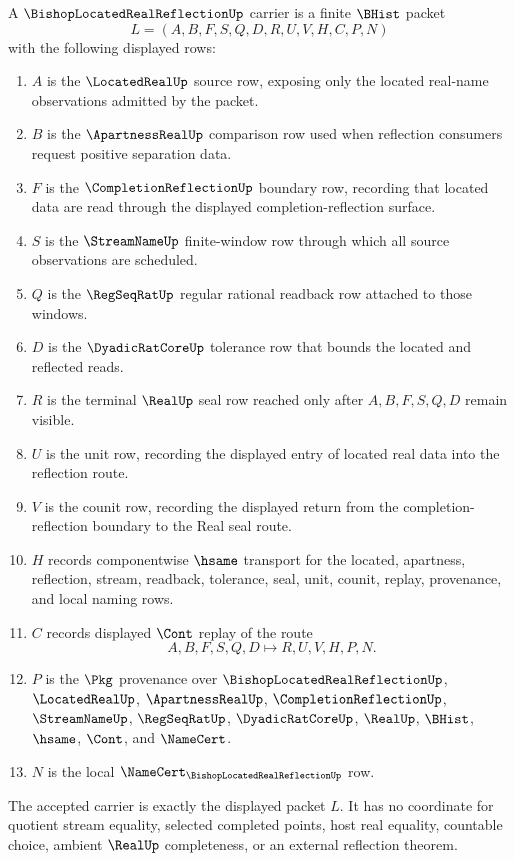 \begin{definition}
\label{def:bishop-located-real-reflection-carrier}
A $\BishopLocatedRealReflectionUp$ carrier is a finite $\BHist$ packet
$$
L=(A,B,F,S,Q,D,R,U,V,H,C,P,N)
$$
with the following displayed rows:
\begin{enumerate}
\item $A$ is the $\LocatedRealUp$ source row, exposing only the located real-name observations admitted by the packet.
\item $B$ is the $\ApartnessRealUp$ comparison row used when reflection consumers request positive separation data.
\item $F$ is the $\CompletionReflectionUp$ boundary row, recording that located data are read through the displayed completion-reflection surface.
\item $S$ is the $\StreamNameUp$ finite-window row through which all source observations are scheduled.
\item $Q$ is the $\RegSeqRatUp$ regular rational readback row attached to those windows.
\item $D$ is the $\DyadicRatCoreUp$ tolerance row that bounds the located and reflected reads.
\item $R$ is the terminal $\RealUp$ seal row reached only after $A,B,F,S,Q,D$ remain visible.
\item $U$ is the unit row, recording the displayed entry of located real data into the reflection route.
\item $V$ is the counit row, recording the displayed return from the completion-reflection boundary to the Real seal route.
\item $H$ records componentwise $\hsame$ transport for the located, apartness, reflection, stream, readback, tolerance, seal, unit, counit, replay, provenance, and local naming rows.
\item $C$ records displayed $\Cont$ replay of the route
$$
A,B,F,S,Q,D \longmapsto R,U,V,H,P,N .
$$
\item $P$ is the $\Pkg$ provenance over $\BishopLocatedRealReflectionUp$, $\LocatedRealUp$, $\ApartnessRealUp$, $\CompletionReflectionUp$, $\StreamNameUp$, $\RegSeqRatUp$, $\DyadicRatCoreUp$, $\RealUp$, $\BHist$, $\hsame$, $\Cont$, and $\NameCert$.
\item $N$ is the local $\NameCert_{\BishopLocatedRealReflectionUp}$ row.
\end{enumerate}
The accepted carrier is exactly the displayed packet $L$. It has no coordinate for quotient stream equality, selected completed points, host real equality, countable choice, ambient $\RealUp$ completeness, or an external reflection theorem.
\end{definition}

